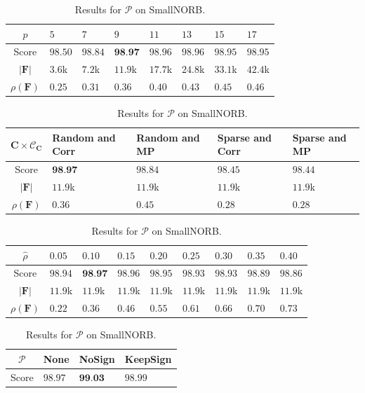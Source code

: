\documentclass[12pt,a4paper,oneside,english]{UPBThesis}
\newcommand{\hctimes}[2]{{#1}\!\times\!{#2}}
\begin{document}
\renewcommand{\arraystretch}{1.2}
\begin{table}
  \caption{Results for $p$ on SmallNORB.}
  \label{table:RecoderEvNORBSmallp}
  \begin{tabularx}{\textwidth}{|c|RRRRRRR|}
    \hline
    $p$ & $5$ & $7$ & $9$ & $11$ & $13$ & $15$ & $17$ \tabularnewline\hline\hline
    Score & $98.50$ & $98.84$ & $\textbf{98.97}$ & $98.96$ & $98.96$ & $98.95$ & $98.95$ \tabularnewline
    $\left|\textbf{F}\right|$ & $3.6$k & $7.2$k & $11.9$k & $17.7$k & $24.8$k & $33.1$k & $42.4$k \tabularnewline
    $\rho(\textbf{F})$ & $0.25$ & $0.31$ & $0.36$ & $0.40$ & $0.43$ & $0.45$ & $0.46$ \tabularnewline
    \hline
  \end{tabularx}
  \caption{Results for $\hctimes{\textbf{C}}{\mathcal{C}_{\textbf{C}}}$ on SmallNORB.}
  \label{table:RecoderEvNORBSmallCCC}
  \begin{tabularx}{\textwidth}{|c|RRRR|}
    \hline
    $\hctimes{\textbf{C}}{\mathcal{C}_{\textbf{C}}}$ & Random and \textbf{Corr} & Random and \textbf{MP} & Sparse and \textbf{Corr} & Sparse and \textbf{MP} \tabularnewline\hline\hline
    Score & $\textbf{98.97}$ & $98.84$ & $98.45$ & $98.44$ \tabularnewline
    $\left|\textbf{F}\right|$ & $11.9$k & $11.9$k & $11.9$k & $11.9$k \tabularnewline
    $\rho(\textbf{F})$ & $0.36$ & $0.45$ & $0.28$ & $0.28$ \tabularnewline
    \hline
  \end{tabularx}
  \caption{Results for $\hat{\rho}$ on SmallNORB.}
  \label{table:RecoderEvNORBSmallrho}
  \begin{tabularx}{\textwidth}{|c|RRRRRRRR|}
    \hline
    $\hat{\rho}$ & $0.05$ & $0.10$ & $0.15$ & $0.20$ & $0.25$ & $0.30$ & $0.35$ & $0.40$ \tabularnewline\hline\hline
    Score & $98.94$ & $\textbf{98.97}$ & $98.96$ & $98.95$ & $98.93$ & $98.93$ & $98.89$ & $98.86$ \tabularnewline
    $\left|\textbf{F}\right|$ & $11.9$k & $11.9$k & $11.9$k & $11.9$k & $11.9$k & $11.9$k & $11.9$k & $11.9$k \tabularnewline
    $\rho(\textbf{F})$ & $0.22$ & $0.36$ & $0.46$ & $0.55$ & $0.61$ & $0.66$ & $0.70$ & $0.73$ \tabularnewline
    \hline
  \end{tabularx}
  \caption{Results for $\mathcal{P}$ on SmallNORB.}
  \label{table:RecoderEvNORBSmallP}
  \begin{tabularx}{\textwidth}{|c|RRR|}
    \hline
    $\mathcal{P}$ & None & NoSign & KeepSign \tabularnewline\hline\hline
    Score & $98.97$ & $\textbf{99.03}$ & $98.99$ \tabularnewline

\end{tabularx}
\end{table}
\end{document}
